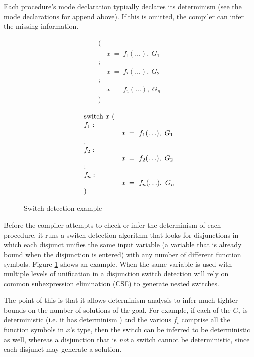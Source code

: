 Each procedure's mode declaration
typically declares its determinism (see the mode declarations for append above).
If this is omitted, the compiler can infer the missing information.


\begin{figure}
\parbox{0.5\textwidth}{
$$
\begin{array}{ll}
(\\
& x~=~f_1(\ldots),~G_1 \\
; \\
& x~=~f_2(\ldots),~G_2 \\
; \\
& x~=~f_n(\ldots),~G_n \\
)
\end{array}
$$}%
\parbox{0.5\textwidth}{
$$
\begin{array}{ll}
\hbox{switch}~x~( \\
f_1: \\
& x~=~f_1(\ldots),~G_1 \\
; \\
f_2: \\
& x~=~f_2(\ldots),~G_2 \\
; \\
f_n: \\
& x~=~f_n(\ldots),~G_n \\
)
\end{array}
$$}
\caption{Switch detection example}
\label{fig:switch_detect}
\end{figure}

Before the compiler attempts to check or infer
the determinism of each procedure,
it runs a switch detection algorithm that looks for disjunctions
in which each disjunct unifies the same input variable
(a variable that is already bound when the disjunction is entered)
with any number of different function symbols.
Figure \ref{fig:switch_detect} shows an example.
When the same variable is used with multiple levels of unification in a
disjunction switch detection will rely on
common subexpression elimination (CSE)
to generate nested switches.

The point of this is that it allows determinism analysis
to infer much tighter bounds on the number of solutions of the goal.
For example, if each of the $G_i$ is deterministic
(i.e. it has determinism )
and the various $f_i$ comprise all the function symbols in $x$'s type,
then the switch can be inferred to be deterministic as well,
whereas a disjunction that is \emph{not} a switch cannot be deterministic,
since each disjunct may generate a solution.


